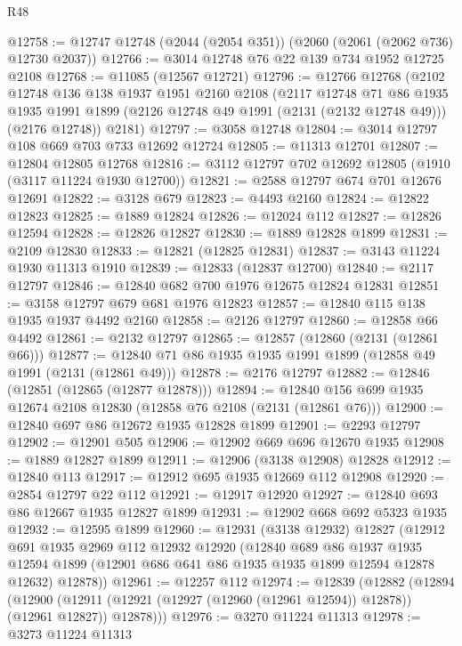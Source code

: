 \begin{lexlean}{R48}
\begin{coremodule}
@12758 := @12747 @12748 (@2044 (@2054 @351)) (@2060 (@2061 (@2062 @736) @12730 @2037))
@12766 := @3014 @12748 @76 @22 @139 @734 @1952 @12725 @2108
@12768 := @11085 (@12567 @12721)
@12796 := @12766
    @12768
    (@2102
      @12748
      @136
      @138
      @1937
      @1951
      @2160
      @2108
      (@2117
        @12748
        @71
        @86
        @1935
        @1935
        @1991
        @1899
        (@2126 @12748 @49 @1991 (@2131 (@2132 @12748 @49)))
        (@2176 @12748))
      @2181)
@12797 := @3058 @12748
@12804 := @3014 @12797 @108 @669 @703 @733 @12692 @12724
@12805 := @11313 @12701
@12807 := @12804 @12805 @12768
@12816 := @3112 @12797 @702 @12692 @12805 (@1910 (@3117 @11224 @1930 @12700))
@12821 := @2588 @12797 @674 @701 @12676 @12691
@12822 := @3128 @679
@12823 := @4493 @2160
@12824 := @12822 @12823
@12825 := @1889 @12824
@12826 := @12024 @112
@12827 := @12826 @12594
@12828 := @12826 @12827
@12830 := @1889 @12828 @1899
@12831 := @2109 @12830
@12833 := @12821 (@12825 @12831)
@12837 := @3143 @11224 @1930 @11313 @1910
@12839 := @12833 (@12837 @12700)
@12840 := @2117 @12797
@12846 := @12840 @682 @700 @1976 @12675 @12824 @12831
@12851 := @3158 @12797 @679 @681 @1976 @12823
@12857 := @12840 @115 @138 @1935 @1937 @4492 @2160
@12858 := @2126 @12797
@12860 := @12858 @66 @4492
@12861 := @2132 @12797
@12865 := @12857 (@12860 (@2131 (@12861 @66)))
@12877 := @12840 @71 @86 @1935 @1935 @1991 @1899 (@12858 @49 @1991 (@2131 (@12861 @49)))
@12878 := @2176 @12797
@12882 := @12846 (@12851 (@12865 (@12877 @12878)))
@12894 := @12840 @156 @699 @1935 @12674 @2108 @12830 (@12858 @76 @2108 (@2131 (@12861 @76)))
@12900 := @12840 @697 @86 @12672 @1935 @12828 @1899
@12901 := @2293 @12797
@12902 := @12901 @505
@12906 := @12902 @669 @696 @12670 @1935
@12908 := @1889 @12827 @1899
@12911 := @12906 (@3138 @12908) @12828
@12912 := @12840 @113
@12917 := @12912 @695 @1935 @12669 @112 @12908
@12920 := @2854 @12797 @22 @112
@12921 := @12917 @12920
@12927 := @12840 @693 @86 @12667 @1935 @12827 @1899
@12931 := @12902 @668 @692 @5323 @1935
@12932 := @12595 @1899
@12960 := @12931
    (@3138 @12932)
    @12827
    (@12912
      @691
      @1935
      @2969
      @112
      @12932
      @12920
      (@12840
        @689
        @86
        @1937
        @1935
        @12594
        @1899
        (@12901 @686 @641 @86 @1935 @1935 @1899 @12594 @12878 @12632)
        @12878))
@12961 := @12257 @112
@12974 := @12839
    (@12882
      (@12894
        (@12900 (@12911 (@12921 (@12927 (@12960 (@12961 @12594)) @12878)) (@12961 @12827)) @12878)))
@12976 := @3270 @11224 @11313
@12978 := @3273 @11224 @11313

\end{coremodule}
\end{lexlean}
